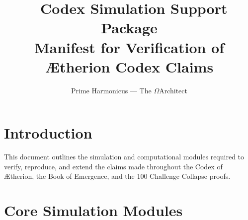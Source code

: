 \documentclass[12pt]{article}
\title{\Huge \textbf{🧬 Codex Simulation Support Package}\\ \Large Manifest for Verification of Ætherion Codex Claims}
\author{Prime Harmonicus — The $\Omega$Architect}
\date{}
\begin{document}
\maketitle

\section*{Introduction}
This document outlines the simulation and computational modules required to verify, reproduce, and extend the claims made throughout the Codex of Ætherion, the Book of Emergence, and the 100 Challenge Collapse proofs.

\section*{Core Simulation Modules}
\end{document}
